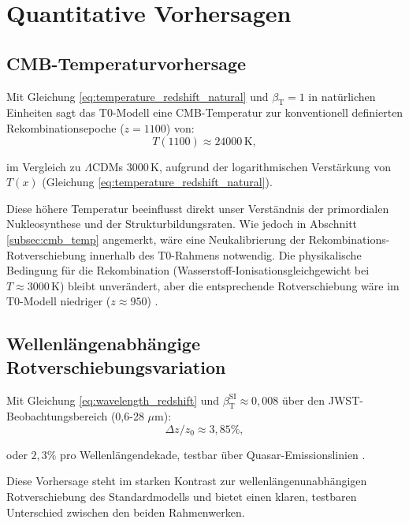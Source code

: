 \documentclass[12pt,a4paper]{article}
\newcommand{\Tfield}{T(x)}
\newcommand{\betaT}{\beta_{\text{T}}}
\newcommand{\LCDM}{\Lambda\text{CDM}}
\begin{document}
	\section{Quantitative Vorhersagen}
	\label{sec:predictions}
	
	\subsection{CMB-Temperaturvorhersage}
	\label{subsec:cmb_temp_prediction}
	
	Mit Gleichung \ref{eq:temperature_redshift_natural} und \(\betaT = 1\) in natürlichen Einheiten sagt das T0-Modell eine CMB-Temperatur zur konventionell definierten Rekombinationsepoche (\(z = 1100\)) von:
	\begin{equation}
		T(1100) \approx 24000 \, \text{K},
		\label{eq:cmb_temp_t0}
	\end{equation}
	
	im Vergleich zu \(\LCDM\)s \(3000 \, \text{K}\), aufgrund der logarithmischen Verstärkung von \(\Tfield\) (Gleichung \ref{eq:temperature_redshift_natural}).
	
	Diese höhere Temperatur beeinflusst direkt unser Verständnis der primordialen Nukleosynthese und der Strukturbildungsraten. Wie jedoch in Abschnitt \ref{subsec:cmb_temp} angemerkt, wäre eine Neukalibrierung der Rekombinations-Rotverschiebung innerhalb des T0-Rahmens notwendig. Die physikalische Bedingung für die Rekombination (Wasserstoff-Ionisationsgleichgewicht bei \(T \approx 3000 \, \text{K}\)) bleibt unverändert, aber die entsprechende Rotverschiebung wäre im T0-Modell niedriger (\(z \approx 950\)) \cite{pascher_temp_2025}.
	
	\subsection{Wellenlängenabhängige Rotverschiebungsvariation}
	\label{subsec:wavelength_redshift_prediction}
	
	Mit Gleichung \ref{eq:wavelength_redshift} und \(\betaT^{\text{SI}} \approx 0,008\) über den JWST-Beobachtungsbereich (0,6-28 \(\mu\text{m}\)):
	\begin{equation}
		\Delta z / z_0 \approx 3,85\%,
		\label{eq:wavelength_variation}
	\end{equation}
	
	oder \(2,3\%\) pro Wellenlängendekade, testbar über Quasar-Emissionslinien \cite{pascher_params_2025}.
	
	Diese Vorhersage steht im starken Kontrast zur wellenlängenunabhängigen Rotverschiebung des Standardmodells und bietet einen klaren, testbaren Unterschied zwischen den beiden Rahmenwerken.
	
\end{document}
